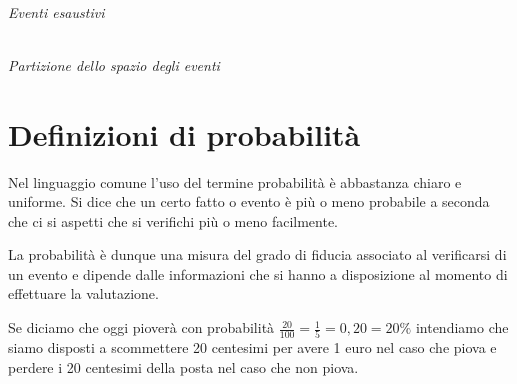 \begin{minipage}{.48\textwidth}
\begin{inaccessibleblock}
\begin{center} 
\eventiesaustivi \\
\emph{Eventi esaustivi}
\end{center}
\end{inaccessibleblock}
\end{minipage}
\hfill
\begin{minipage}{.48\textwidth}
\begin{inaccessibleblock}
\begin{center} 
\partizioneeventi \\
\emph{Partizione dello spazio degli eventi}
\end{center}
\end{inaccessibleblock}
\end{minipage}


\section{Definizioni di probabilità}
\label{sec:09_definizioni}

Nel linguaggio comune l'uso del termine probabilità è abbastanza chiaro e 
uniforme. Si dice che un certo fatto o evento è più o meno probabile a 
seconda 
che ci si aspetti che si verifichi più o meno facilmente.

La probabilità è dunque una misura del grado di fiducia associato al 
verificarsi di un evento e dipende dalle informazioni che si hanno a 
disposizione al 
momento di effettuare la valutazione.

Se diciamo che oggi pioverà con probabilità 
\(\frac{20}{100} = \frac{1}{5} = 0,20 = 20\%\) 
intendiamo che siamo disposti a scommettere 20 centesimi per avere 1 euro 
nel caso che piova e perdere i 20 centesimi della posta nel caso che non 
piova.


